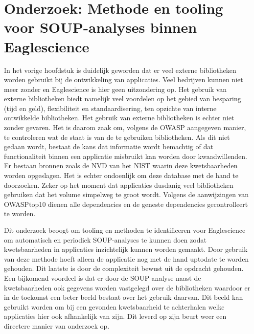 \chapter{Onderzoek: Methode en tooling voor SOUP-analyses binnen Eaglescience}\label{ch:onderzoek-tool-methode}
In het vorige hoofdstuk is duidelijk geworden dat er veel externe bibliotheken worden gebruikt bij de ontwikkeling van applicaties. Veel bedrijven kunnen niet meer zonder en Eaglescience is hier geen uitzondering op. Het gebruik van externe bibliotheken biedt namelijk veel voordelen op het gebied van besparing (tijd en geld), flexibiliteit en standaardisering, ten opzichte van interne ontwikkelde bibliotheken. Het gebruik van externe bibliotheken is echter niet zonder gevaren. Het is daarom zaak om, volgens de OWASP aangegeven manier, te controleren wat de staat is van de te gebruiken bibliotheken. Als dit niet gedaan wordt, bestaat de kans dat informatie wordt bemachtig of dat functionaliteit binnen een applicatie misbruikt kan worden door kwaadwillenden. Er bestaan bronnen zoals de NVD van het NIST waarin deze kwetsbaarheden worden opgeslagen. Het is echter ondoenlijk om deze database met de hand te doorzoeken. Zeker op het moment dat applicaties dusdanig veel bibliotheken gebruiken dat het volume simpelweg te groot wordt. Volgens de aanwijzingen van OWASP\-top10 dienen alle dependencies en de geneste dependencies gecontrolleert te worden.

Dit onderzoek beoogt om tooling en methoden te identificeren voor Eaglescience om automatisch en periodiek SOUP-analyses te kunnen doen zodat kwetsbaarheden in applicaties inzichtelijk kunnen worden gemaakt. Door gebruik van deze methode hoeft alleen de applicatie nog met de hand up\-to\-date te worden gehouden. Dit laatste is door de complexiteit bewust uit de opdracht gehouden. Een bijkomend voordeel is dat er door de SOUP-analyse naast de kwetsbaarheden ook gegevens worden vastgelegd over de bibliotheken waardoor er in de toekomst een beter beeld bestaat over het gebruik daarvan. Dit beeld kan gebruikt worden om bij een gevonden kwetsbaarheid te achterhalen welke applicaties hier ook afhankelijk van zijn. Dit leverd op zijn beurt weer een directere manier van onderzoek op.

